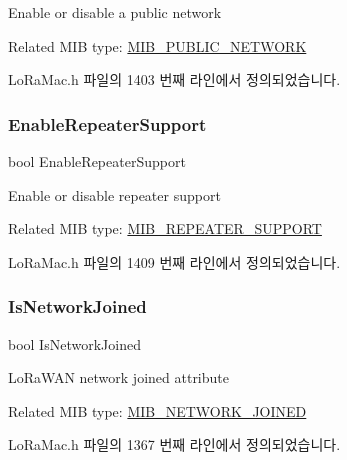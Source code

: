 Enable or disable a public network

Related M\+IB type\+: \mbox{\hyperlink{group___l_o_r_a_m_a_c_gga32ea83d13a3f5bb4b3ec2ace2319ab61ab2819c46ba94b53c1fb2c3a0bfa75e48}{M\+I\+B\+\_\+\+P\+U\+B\+L\+I\+C\+\_\+\+N\+E\+T\+W\+O\+RK}} 

Lo\+Ra\+Mac.\+h 파일의 1403 번째 라인에서 정의되었습니다.

\mbox{\label{unionu_mib_param_a6af0230b4a6c8b1caf81b8eb6be2ca1f}} 
\subsubsection{\texorpdfstring{Enable\+Repeater\+Support}{EnableRepeaterSupport}}
{\footnotesize\ttfamily bool Enable\+Repeater\+Support}

Enable or disable repeater support

Related M\+IB type\+: \mbox{\hyperlink{group___l_o_r_a_m_a_c_gga32ea83d13a3f5bb4b3ec2ace2319ab61a2d0a50cc4dd24771854bd138934ef3e5}{M\+I\+B\+\_\+\+R\+E\+P\+E\+A\+T\+E\+R\+\_\+\+S\+U\+P\+P\+O\+RT}} 

Lo\+Ra\+Mac.\+h 파일의 1409 번째 라인에서 정의되었습니다.

\mbox{\label{unionu_mib_param_a1a4811dfe6101a9f87ecb1aaaf61e6c7}} 
\subsubsection{\texorpdfstring{Is\+Network\+Joined}{IsNetworkJoined}}
{\footnotesize\ttfamily bool Is\+Network\+Joined}

Lo\+Ra\+W\+AN network joined attribute

Related M\+IB type\+: \mbox{\hyperlink{group___l_o_r_a_m_a_c_gga32ea83d13a3f5bb4b3ec2ace2319ab61a2e2a91bfbbb7bbbe1467eec239effbd0}{M\+I\+B\+\_\+\+N\+E\+T\+W\+O\+R\+K\+\_\+\+J\+O\+I\+N\+ED}} 

Lo\+Ra\+Mac.\+h 파일의 1367 번째 라인에서 정의되었습니다.

\mbox{\label{unionu_mib_param_a59ed32d2c7ce6d0b2011da8b0109b391}} 
